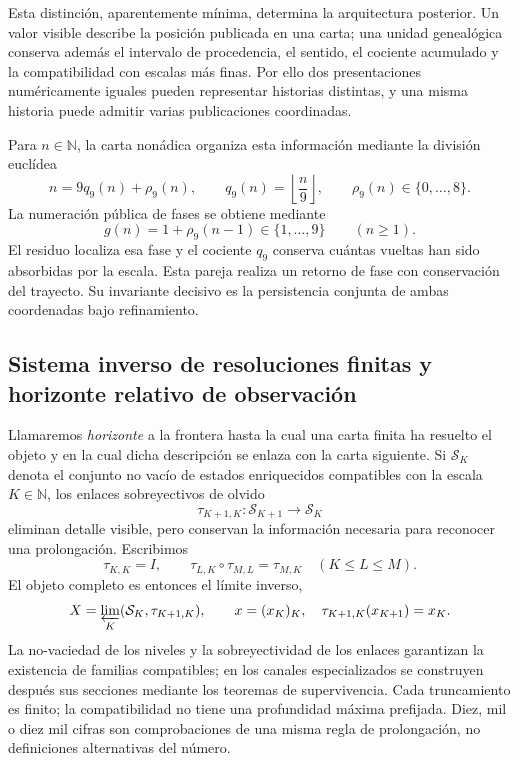 Esta distinción, aparentemente mínima, determina la arquitectura posterior.
Un valor visible describe la posición publicada en una carta; una unidad
genealógica conserva además el intervalo de procedencia, el sentido, el
cociente acumulado y la compatibilidad con escalas más finas. Por ello dos
presentaciones numéricamente iguales pueden representar historias distintas,
y una misma historia puede admitir varias publicaciones coordinadas.

Para \(n\in\mathbb N\), la carta nonádica organiza esta información mediante
la división euclídea
\begin{equation}\label{p12-83-c0-s1:eq:horizonte-division-nonadica}
 n=9q_9(n)+\rho_9(n),
 \qquad q_9(n)=\left\lfloor\frac n9\right\rfloor,
 \qquad \rho_9(n)\in\{0,\ldots,8\}.
\end{equation}
La numeración pública de fases se obtiene mediante
\[
 g(n)=1+\rho_9(n-1)\in\{1,\ldots,9\}\qquad(n\geq1).
\]
El residuo localiza esa fase y el cociente \(q_9\) conserva cuántas vueltas
han sido absorbidas por la escala. Esta pareja realiza un retorno de fase
con conservación del trayecto. Su invariante decisivo es la persistencia
conjunta de ambas coordenadas bajo refinamiento.

\subsection*{Sistema inverso de resoluciones finitas y horizonte relativo de observación}

Llamaremos \emph{horizonte} a la frontera hasta la cual una carta finita ha
resuelto el objeto y en la cual dicha descripción se enlaza con la carta
siguiente. Si
\(\mathcal S_K\) denota el conjunto no vacío de estados enriquecidos
compatibles con la escala \(K\in\mathbb N\), los enlaces sobreyectivos de
olvido
\[
 \tau_{K+1,K}:\mathcal S_{K+1}\longrightarrow\mathcal S_K
\]
eliminan detalle visible, pero conservan la información necesaria para
reconocer una prolongación. Escribimos
\[
 \tau_{K,K}=I,\qquad
 \tau_{L,K}\circ\tau_{M,L}=\tau_{M,K}
 \quad(K\leq L\leq M).
\]
El objeto completo es entonces el límite inverso,
\begin{equation}\label{p12-83-c0-s1:eq:horizonte-limite-inverso}
 X=\varprojlim_K(\mathcal S_K,\tau_{K+1,K}),
 \qquad
 x=(x_K)_K,\quad \tau_{K+1,K}(x_{K+1})=x_K.
\end{equation}
La no-vaciedad de los niveles y la sobreyectividad de los enlaces garantizan
la existencia de familias compatibles; en los canales especializados se
construyen después sus secciones mediante los teoremas de supervivencia.
Cada truncamiento es finito; la compatibilidad no tiene una profundidad
máxima prefijada. Diez, mil o diez mil cifras son comprobaciones de una misma
regla de prolongación, no definiciones alternativas del número.

